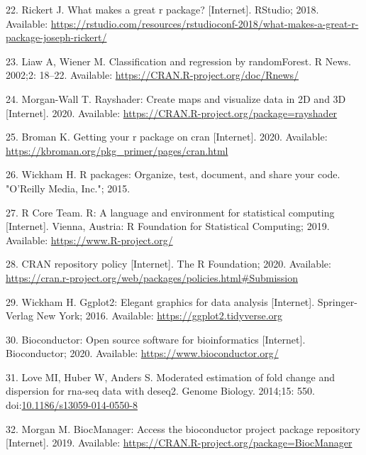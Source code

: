 \documentclass[10pt,letterpaper]{article}
\begin{document}
\leavevmode\hypertarget{ref-rickert2018}{}%
22. Rickert J. What makes a great r package? {[}Internet{]}. RStudio;
2018. Available:
\url{https://rstudio.com/resources/rstudioconf-2018/what-makes-a-great-r-package-joseph-rickert/}

\leavevmode\hypertarget{ref-randomforest}{}%
23. Liaw A, Wiener M. Classification and regression by randomForest. R
News. 2002;2: 18--22. Available:
\url{https://CRAN.R-project.org/doc/Rnews/}

\leavevmode\hypertarget{ref-rayshader}{}%
24. Morgan-Wall T. Rayshader: Create maps and visualize data in 2D and
3D {[}Internet{]}. 2020. Available:
\url{https://CRAN.R-project.org/package=rayshader}

\leavevmode\hypertarget{ref-broman2020}{}%
25. Broman K. Getting your r package on cran {[}Internet{]}. 2020.
Available: \url{https://kbroman.org/pkg_primer/pages/cran.html}

\leavevmode\hypertarget{ref-wickham2015}{}%
26. Wickham H. R packages: Organize, test, document, and share your
code. "O'Reilly Media, Inc."; 2015.

\leavevmode\hypertarget{ref-baseR}{}%
27. R Core Team. R: A language and environment for statistical computing
{[}Internet{]}. Vienna, Austria: R Foundation for Statistical Computing;
2019. Available: \url{https://www.R-project.org/}

\leavevmode\hypertarget{ref-cranpolicy2020}{}%
28. CRAN repository policy {[}Internet{]}. The R Foundation; 2020.
Available:
\url{https://cran.r-project.org/web/packages/policies.html\#Submission}

\leavevmode\hypertarget{ref-ggplot2}{}%
29. Wickham H. Ggplot2: Elegant graphics for data analysis
{[}Internet{]}. Springer-Verlag New York; 2016. Available:
\url{https://ggplot2.tidyverse.org}

\leavevmode\hypertarget{ref-bioconductor}{}%
30. Bioconductor: Open source software for bioinformatics
{[}Internet{]}. Bioconductor; 2020. Available:
\url{https://www.bioconductor.org/}

\leavevmode\hypertarget{ref-DESeq2}{}%
31. Love MI, Huber W, Anders S. Moderated estimation of fold change and
dispersion for rna-seq data with deseq2. Genome Biology. 2014;15: 550.
doi:\href{https://doi.org/10.1186/s13059-014-0550-8}{10.1186/s13059-014-0550-8}

\leavevmode\hypertarget{ref-BiocManager}{}%
32. Morgan M. BiocManager: Access the bioconductor project package
repository {[}Internet{]}. 2019. Available:
\url{https://CRAN.R-project.org/package=BiocManager}
\end{document}
